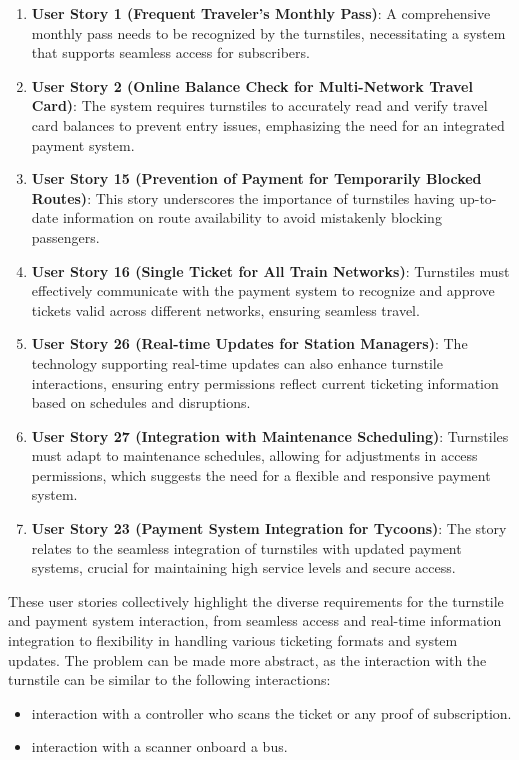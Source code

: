 \begin{enumerate}[noitemsep]
    \item \textbf{User Story 1 (Frequent Traveler's Monthly Pass)}: A comprehensive monthly pass needs to be recognized by the turnstiles, necessitating a system that supports seamless access for subscribers.
    
    \item \textbf{User Story 2 (Online Balance Check for Multi-Network Travel Card)}: The system requires turnstiles to accurately read and verify travel card balances to prevent entry issues, emphasizing the need for an integrated payment system.
    
    \item \textbf{User Story 15 (Prevention of Payment for Temporarily Blocked Routes)}: This story underscores the importance of turnstiles having up-to-date information on route availability to avoid mistakenly blocking passengers.
    
    \item \textbf{User Story 16 (Single Ticket for All Train Networks)}: Turnstiles must effectively communicate with the payment system to recognize and approve tickets valid across different networks, ensuring seamless travel.
    
    \item \textbf{User Story 26 (Real-time Updates for Station Managers)}: The technology supporting real-time updates can also enhance turnstile interactions, ensuring entry permissions reflect current ticketing information based on schedules and disruptions.
    
    \item \textbf{User Story 27 (Integration with Maintenance Scheduling)}: Turnstiles must adapt to maintenance schedules, allowing for adjustments in access permissions, which suggests the need for a flexible and responsive payment system.
    
    \item \textbf{User Story 23 (Payment System Integration for Tycoons)}: The story relates to the seamless integration of turnstiles with updated payment systems, crucial for maintaining high service levels and secure access.
\end{enumerate}

These user stories collectively highlight the diverse requirements for the turnstile and payment system interaction, from seamless access and real-time information integration to flexibility in handling various ticketing formats and system updates.
The problem can be made more abstract, as the interaction with the turnstile can be similar to the following interactions:
\begin{itemize}
    \item interaction with a controller who scans the ticket or any proof of subscription.
    \item interaction with a scanner onboard a bus.
\end{itemize}

